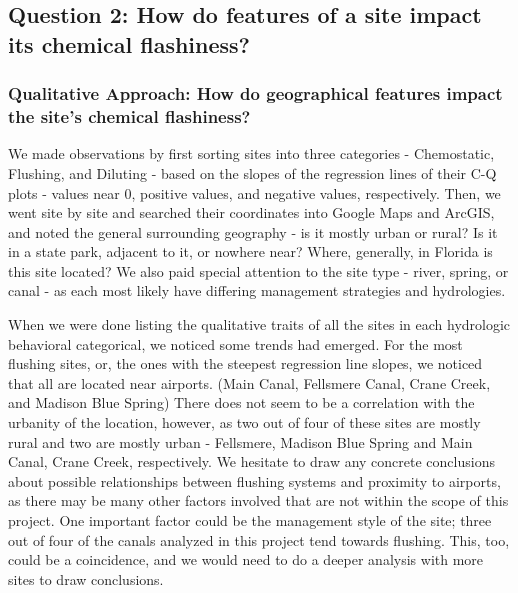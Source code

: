 \documentclass[12pt,]{article}
\begin{document}
\hypertarget{question-2-how-do-features-of-a-site-impact-its-chemical-flashiness}{%
\subsection{Question 2: How do features of a site impact its chemical
flashiness?}\label{question-2-how-do-features-of-a-site-impact-its-chemical-flashiness}}

\hypertarget{qualitative-approach-how-do-geographical-features-impact-the-sites-chemical-flashiness}{%
\subsubsection{Qualitative Approach: How do geographical features impact
the site's chemical
flashiness?}\label{qualitative-approach-how-do-geographical-features-impact-the-sites-chemical-flashiness}}

We made observations by first sorting sites into three categories -
Chemostatic, Flushing, and Diluting - based on the slopes of the
regression lines of their C-Q plots - values near 0, positive values,
and negative values, respectively. Then, we went site by site and
searched their coordinates into Google Maps and ArcGIS, and noted the
general surrounding geography - is it mostly urban or rural? Is it in a
state park, adjacent to it, or nowhere near? Where, generally, in
Florida is this site located? We also paid special attention to the site
type - river, spring, or canal - as each most likely have differing
management strategies and hydrologies.

When we were done listing the qualitative traits of all the sites in
each hydrologic behavioral categorical, we noticed some trends had
emerged. For the most flushing sites, or, the ones with the steepest
regression line slopes, we noticed that all are located near airports.
(Main Canal, Fellsmere Canal, Crane Creek, and Madison Blue Spring)
There does not seem to be a correlation with the urbanity of the
location, however, as two out of four of these sites are mostly rural
and two are mostly urban - Fellsmere, Madison Blue Spring and Main
Canal, Crane Creek, respectively. We hesitate to draw any concrete
conclusions about possible relationships between flushing systems and
proximity to airports, as there may be many other factors involved that
are not within the scope of this project. One important factor could be
the management style of the site; three out of four of the canals
analyzed in this project tend towards flushing. This, too, could be a
coincidence, and we would need to do a deeper analysis with more sites
to draw conclusions.
\end{document}
